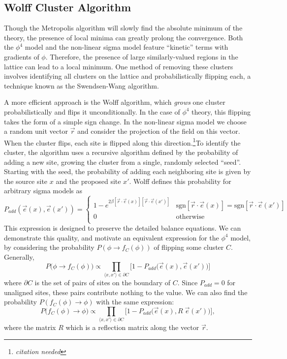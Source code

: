\documentclass[12pt]{report}
\newcommand{\e}{\vec e}
\newcommand{\citeneeded}{\footnote{\textit{citation needed}}}
\begin{document}
\subsection{Wolff Cluster Algorithm}

Though the Metropolis algorithm will slowly find the absolute minimum of the theory, the presence of local minima can greatly prolong the convergence. Both the $\phi^4$ model and the non-linear sigma model feature ``kinetic'' terms with gradients of $\phi$. Therefore, the presence of large similarly-valued regions in the lattice can lead to a local minimum. One method of removing these clusters involves identifying all clusters on the lattice and probabilistically flipping each, a technique known as the Swendsen-Wang algorithm\cite{swendsen1987}. 

A more efficient approach is the Wolff algorithm\cite{wolff1989}, which \textit{grows} one cluster probabilistically and flips it unconditionally. In the case of $\phi^4$ theory, this flipping takes the form of a simple sign change. In the non-linear sigma model we choose a random unit vector $\vec r$ and consider the projection of the field on this vector. When the cluster flips, each site is flipped along this direction.\citeneeded To identify the cluster, the algorithm uses a recursive algorithm defined by the probability of adding a new site, growing the cluster from a single, randomly selected ``seed''. Starting with the seed, the probability of adding each neighboring site is given by the source site $x$ and the proposed site $x'$. Wolff defines this probability for arbitrary sigma models as 
\begin{equation}
    \label{eq:wolff padd}
    P_{add}(\e(x),\e(x')) = \begin{cases} 
        1 - e^{2\beta [\vec{r} \cdot \e(x)][\vec{r} \cdot \e(x')]} & \mathrm{sgn}[\vec{r}\cdot\e(x)]=\mathrm{sgn}[\vec{r}\cdot\e(x')]\\
        0 & \mathrm{otherwise} \\
   \end{cases}
\end{equation}
This expression is designed to preserve the detailed balance equations. We can demonstrate this quality, and motivate an equivalent expression for the $\phi^4$ model, by considering the probability $P(\phi\rightarrow f_C(\phi))$ of flipping some cluster $C$. Generally,
\begin{equation}
    P\big(\phi \rightarrow f_C\left(\phi\right)\big) \propto \prod_{\langle x,x'\rangle \in \partial C}  \Big[1 - P_{add}\big(\e(x),\e(x')\big)\Big]
\end{equation}
where $\partial C$ is the set of pairs of sites on the boundary of $C$. Since $P_{add}=0$ for unaligned sites, these pairs contribute nothing to the value. We can also find the probability $P(f_C(\phi) \rightarrow \phi)$ with the same expression:
\begin{equation}
P\big(f_C(\phi)\rightarrow \phi \big) \propto \prod_{\langle x,x'\rangle \in \partial C}  \Big[1 - P_{add}\big(\e(x),R\;\e(x')\big)\Big],
\end{equation}
where the matrix $R$ which is a reflection matrix along the vector $\vec{r}$.
\end{document}
